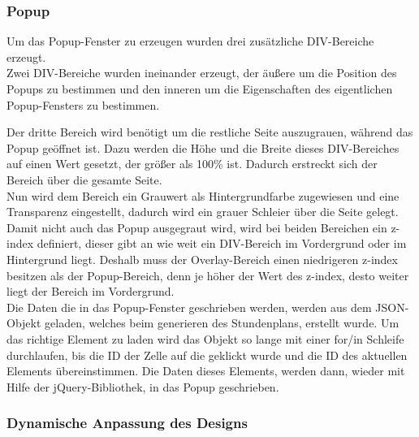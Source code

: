 \subsubsection{Popup}

Um das Popup-Fenster zu erzeugen wurden drei zusätzliche DIV-Bereiche erzeugt.\\
Zwei DIV-Bereiche wurden ineinander erzeugt, der äußere um die Position des Popups zu bestimmen und den inneren um die Eigenschaften des eigentlichen Popup-Fensters zu bestimmen.\\



\newpage



Der dritte Bereich wird benötigt um die restliche Seite auszugrauen, während das Popup geöffnet ist. Dazu werden die Höhe und die Breite dieses DIV-Bereiches auf einen Wert gesetzt, der größer als 100\% ist. Dadurch erstreckt sich der Bereich über die gesamte Seite.\\
Nun wird dem  Bereich ein Grauwert als Hintergrundfarbe zugewiesen und eine Transparenz eingestellt, dadurch wird ein grauer Schleier über die Seite gelegt.\\
Damit nicht auch das Popup ausgegraut wird, wird bei beiden Bereichen ein z-index definiert, dieser gibt an wie weit ein DIV-Bereich im Vordergrund oder im Hintergrund liegt. Deshalb muss der Overlay-Bereich einen niedrigeren z-index besitzen als der Popup-Bereich, denn je höher der Wert des z-index, desto weiter liegt der Bereich im Vordergrund.\\

Die Daten die in das Popup-Fenster geschrieben werden, werden aus dem JSON-Objekt geladen, welches beim generieren des Stundenplans, erstellt wurde. Um das richtige Element zu laden wird das Objekt so lange mit einer for/in Schleife durchlaufen, bis die ID der Zelle auf die geklickt wurde und die ID des aktuellen Elements übereinstimmen. Die Daten dieses Elements, werden dann, wieder mit Hilfe der jQuery-Bibliothek, in das Popup geschrieben.\\


\subsubsection{Dynamische Anpassung des Designs}

